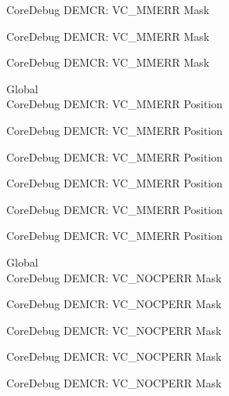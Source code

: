 \begin{DoxyRefList}
\label{deprecated__deprecated000430}%
%
Core\+Debug DEMCR\+: VC\+\_\+\+MMERR Mask 

\label{deprecated__deprecated000519}%
%
Core\+Debug DEMCR\+: VC\+\_\+\+MMERR Mask 

\label{deprecated__deprecated000621}%
%
Core\+Debug DEMCR\+: VC\+\_\+\+MMERR Mask  
\item[Global \doxylink{group___c_m_s_i_s___core_debug_ga444454f7c7748e76cd76c3809c887c41}{Core\+Debug\+\_\+\+DEMCR\+\_\+\+VC\+\_\+\+MMERR\+\_\+\+Pos} ]\hfill \\
\label{deprecated__deprecated000067}%
%
Core\+Debug DEMCR\+: VC\+\_\+\+MMERR Position 

\label{deprecated__deprecated000211}%
%
Core\+Debug DEMCR\+: VC\+\_\+\+MMERR Position 

\label{deprecated__deprecated000353}%
%
Core\+Debug DEMCR\+: VC\+\_\+\+MMERR Position 

\label{deprecated__deprecated000429}%
%
Core\+Debug DEMCR\+: VC\+\_\+\+MMERR Position 

\label{deprecated__deprecated000518}%
%
Core\+Debug DEMCR\+: VC\+\_\+\+MMERR Position 

\label{deprecated__deprecated000620}%
%
Core\+Debug DEMCR\+: VC\+\_\+\+MMERR Position  
\item[Global \doxylink{group___c_m_s_i_s___core_debug_ga03ee58b1b02fdbf21612809034562f1c}{Core\+Debug\+\_\+\+DEMCR\+\_\+\+VC\+\_\+\+NOCPERR\+\_\+\+Msk} ]\hfill \\
\label{deprecated__deprecated000066}%
%
Core\+Debug DEMCR\+: VC\+\_\+\+NOCPERR Mask 

\label{deprecated__deprecated000210}%
%
Core\+Debug DEMCR\+: VC\+\_\+\+NOCPERR Mask 

\label{deprecated__deprecated000352}%
%
Core\+Debug DEMCR\+: VC\+\_\+\+NOCPERR Mask 

\label{deprecated__deprecated000428}%
%
Core\+Debug DEMCR\+: VC\+\_\+\+NOCPERR Mask 

\label{deprecated__deprecated000517}%
%
Core\+Debug DEMCR\+: VC\+\_\+\+NOCPERR Mask 


\end{DoxyRefList}
